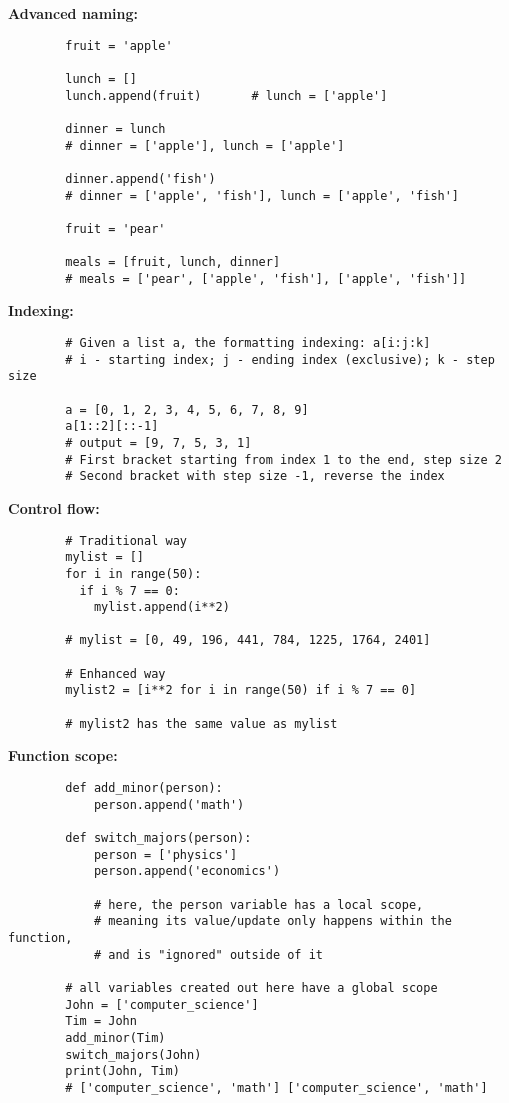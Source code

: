 \documentclass[12pt]{article}
\begin{document}
\medskip
\noindent \textbf{Advanced naming:}
    \begin{verbatim}
        fruit = 'apple'

        lunch = []
        lunch.append(fruit)       # lunch = ['apple']
    
        dinner = lunch            
        # dinner = ['apple'], lunch = ['apple']
        
        dinner.append('fish')    
        # dinner = ['apple', 'fish'], lunch = ['apple', 'fish']
    
        fruit = 'pear'            
    
        meals = [fruit, lunch, dinner] 
        # meals = ['pear', ['apple', 'fish'], ['apple', 'fish']]
    \end{verbatim}

\medskip
\noindent \textbf{Indexing:}
    \begin{verbatim}
        # Given a list a, the formatting indexing: a[i:j:k]
        # i - starting index; j - ending index (exclusive); k - step size

        a = [0, 1, 2, 3, 4, 5, 6, 7, 8, 9]
        a[1::2][::-1]
        # output = [9, 7, 5, 3, 1]
        # First bracket starting from index 1 to the end, step size 2
        # Second bracket with step size -1, reverse the index
    \end{verbatim}

\newpage
\noindent \textbf{Control flow:}
    \begin{verbatim}
        # Traditional way
        mylist = []
        for i in range(50):
          if i % 7 == 0:
            mylist.append(i**2)

        # mylist = [0, 49, 196, 441, 784, 1225, 1764, 2401]

        # Enhanced way
        mylist2 = [i**2 for i in range(50) if i % 7 == 0]
        
        # mylist2 has the same value as mylist
    \end{verbatim}

\medskip
\noindent \textbf{Function scope:}
    \begin{verbatim}
        def add_minor(person):
            person.append('math')
    
        def switch_majors(person):
            person = ['physics']
            person.append('economics')
            
            # here, the person variable has a local scope, 
            # meaning its value/update only happens within the function, 
            # and is "ignored" outside of it
            
        # all variables created out here have a global scope
        John = ['computer_science']
        Tim = John
        add_minor(Tim)
        switch_majors(John)
        print(John, Tim)
        # ['computer_science', 'math'] ['computer_science', 'math']
    \end{verbatim}
\end{document}
